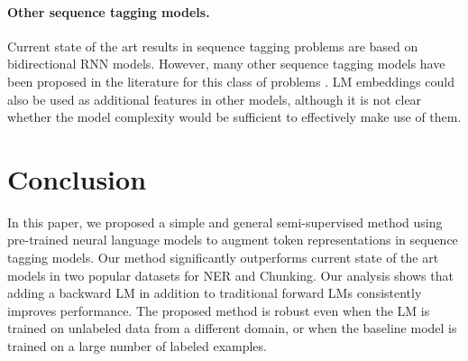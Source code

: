\documentclass[11pt,a4paper]{article}
\begin{document}
\paragraph{Other sequence tagging models.}
Current state of the art results in sequence tagging problems are based on bidirectional RNN models.
However, many other sequence tagging models have been proposed in the literature for this class of problems \citep[e.g.,][]{CRF:Lafferty2001,collins:02}. 
LM embeddings could also be used as additional features in other models, although it is not clear whether the model complexity would be sufficient to effectively make use of them.


\section{Conclusion}
In this paper, we proposed a simple and general semi-supervised method using pre-trained neural language models to augment token representations in sequence tagging models.
Our method significantly outperforms current state of the art models in two popular datasets for NER and Chunking. 
Our analysis shows that adding a backward LM in addition to traditional forward LMs consistently improves performance.
The proposed method is robust even when the LM is trained on unlabeled data from a different domain, or when the baseline model is trained on a large number of labeled examples.



\end{document}
